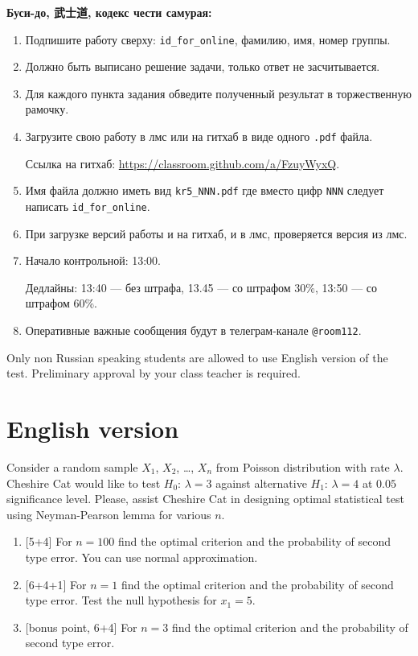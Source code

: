 \documentclass[12pt]{article}
\begin{document}
\vspace{15mm}


\textbf{Буси-до, 武士道, кодекс чести самурая:}

\vspace{5mm}

\begin{enumerate}
\item Подпишите работу сверху: \verb|id_for_online|, фамилию, имя, номер группы.
\item Должно быть выписано решение задачи, только ответ не засчитывается.
\item Для каждого пункта задания обведите полученный результат в торжественную рамочку.
\item Загрузите свою работу в лмс или на гитхаб в виде одного \verb|.pdf| файла.

Ссылка на гитхаб: \url{https://classroom.github.com/a/FzuyWyxQ}.
\item Имя файла должно иметь вид \verb|kr5_NNN.pdf| где вместо цифр \verb|NNN| следует написать \verb|id_for_online|.
\item При загрузке версий работы и на гитхаб, и в лмс, проверяется версия из лмс. 
\item Начало контрольной: 13:00. 

Дедлайны: 13:40 — без штрафа, 13.45 — со штрафом 30\%, 13:50 — со штрафом 60\%.
\item Оперативные важные сообщения будут в телеграм-канале \verb|@room112|.
\end{enumerate}


\newpage
{}


Only non Russian speaking students are allowed to use English version of the test.
Preliminary approval by your class teacher is required. 

\section*{English version}


Consider a random sample $X_1$, $X_2$, \ldots, $X_n$ from Poisson distribution with rate $\lambda$. 
Cheshire Cat would like to test $H_0$: $\lambda = 3$ against alternative $H_1$: $\lambda = 4$ at
$0.05$ significance level. Please, assist Cheshire Cat in designing optimal statistical test
using Neyman-Pearson lemma for various $n$. 

\begin{enumerate}
  \item {[5+4]} For $n=100$ find the optimal criterion and the probability of second type error. You can use normal approximation.
  \item {[6+4+1]} For $n=1$ find the optimal criterion and the probability of second type error. Test the null hypothesis for $x_1 = 5$. 
  \item {[bonus point, 6+4]} For $n=3$ find the optimal criterion and the probability of second type error.
\end{enumerate}
 
\end{document}
